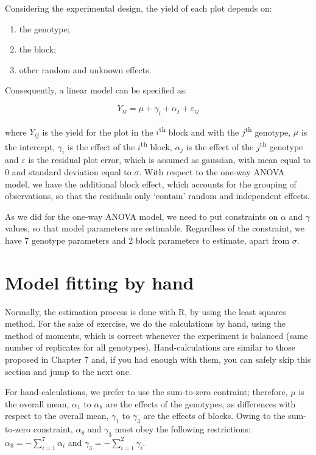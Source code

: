 \documentclass[a4paper,12pt,oneside]{book}
\providecommand{\tightlist}{%
  \setlength{\itemsep}{0pt}\setlength{\parskip}{0pt}}
\begin{document}
Considering the experimental design, the yield of each plot depends on:

\begin{enumerate}
\def\labelenumi{\arabic{enumi}.}
\tightlist
\item
  the genotype;
\item
  the block;
\item
  other random and unknown effects.
\end{enumerate}

Consequently, a linear model can be specified as:

\[ Y_{ij} = \mu + \gamma_i + \alpha_j + \varepsilon_{ij}\]

where \(Y_{ij}\) is the yield for the plot in the \(i\)\textsuperscript{th} block and with the \(j\)\textsuperscript{th} genotype, \(\mu\) is the intercept, \(\gamma_i\) is the effect of the \(i\)\textsuperscript{th} block, \(\alpha_j\) is the effect of the \(j\)\textsuperscript{th} genotype and \(\varepsilon\) is the residual plot error, which is assumed as gaussian, with mean equal to 0 and standard deviation equal to \(\sigma\). With respect to the one-way ANOVA model, we have the additional block effect, which accounts for the grouping of observations, so that the residuals only `contain' random and independent effects.

As we did for the one-way ANOVA model, we need to put constraints on \(\alpha\) and \(\gamma\) values, so that model parameters are estimable. Regardless of the constraint, we have 7 genotype parameters and 2 block parameters to estimate, apart from \(\sigma\).

\hypertarget{model-fitting-by-hand}{%
\section{Model fitting by hand}\label{model-fitting-by-hand}}

Normally, the estimation process is done with R, by using the least squares method. For the sake of exercise, we do the calculations by hand, using the method of moments, which is correct whenever the experiment is balanced (same number of replicates for all genotypes). Hand-calculations are similar to those proposed in Chapter 7 and, if you had enough with them, you can safely skip this section and jump to the next one.

For hand-calculations, we prefer to use the sum-to-zero contraint; therefore, \(\mu\) is the overall mean, \(\alpha_1\) to \(\alpha_8\) are the effects of the genotypes, as differences with respect to the overall mean, \(\gamma_1\) to \(\gamma_3\) are the effects of blocks. Owing to the sum-to-zero constraint, \(\alpha_8\) and \(\gamma_3\) must obey the following restrictions: \(\alpha_8 = -\sum_{i=1}^{7} \alpha_i\) and \(\gamma_3 = -\sum_{i=1}^{2} \gamma_i\).
\end{document}
